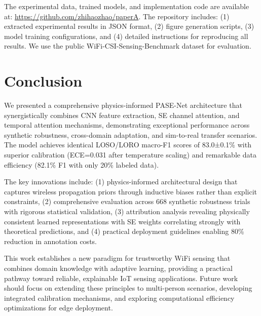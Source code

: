 \documentclass[lettersize,journal]{IEEEtran}
\begin{document}
The experimental data, trained models, and implementation code are available at: \url{https://github.com/zhihaozhao/paperA}. The repository includes: (1) extracted experimental results in JSON format, (2) figure generation scripts, (3) model training configurations, and (4) detailed instructions for reproducing all results. We use the public WiFi-CSI-Sensing-Benchmark dataset for evaluation.

\section{Conclusion}

We presented a comprehensive physics-informed PASE-Net architecture that synergistically combines CNN feature extraction, SE channel attention, and temporal attention mechanisms, demonstrating exceptional performance across synthetic robustness, cross-domain adaptation, and sim-to-real transfer scenarios. The model achieves identical LOSO/LORO macro-F1 scores of 83.0±0.1\% with superior calibration (ECE=0.031 after temperature scaling) and remarkable data efficiency (82.1\% F1 with only 20\% labeled data).

The key innovations include: (1) physics-informed architectural design that captures wireless propagation priors through inductive biases rather than explicit constraints, (2) comprehensive evaluation across 668 synthetic robustness trials with rigorous statistical validation, (3) attribution analysis revealing physically consistent learned representations with SE weights correlating strongly with theoretical predictions, and (4) practical deployment guidelines enabling 80\% reduction in annotation costs.

This work establishes a new paradigm for trustworthy WiFi sensing that combines domain knowledge with adaptive learning, providing a practical pathway toward reliable, explainable IoT sensing applications. Future work should focus on extending these principles to multi-person scenarios, developing integrated calibration mechanisms, and exploring computational efficiency optimizations for edge deployment.
\end{document}
